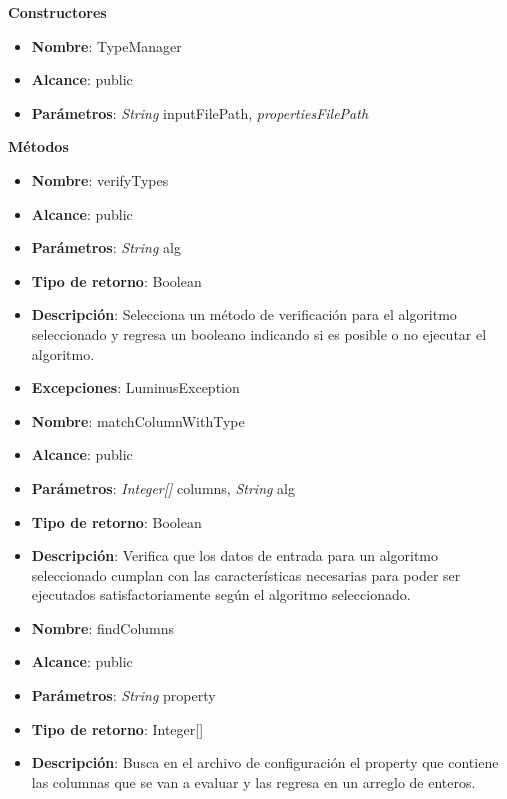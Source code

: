 \textbf{Constructores}
\begin{UClist}
	\begin{itemize}
		\item \textbf{Nombre}: TypeManager
		\item \textbf{Alcance}: public
		\item \textbf{Parámetros}: \emph{String} inputFilePath, \emph{propertiesFilePath}
	\end{itemize}
\end{UClist}
\textbf{Métodos}
\begin{UClist}
	\begin{itemize}
		\item \textbf{Nombre}: verifyTypes
		\item \textbf{Alcance}: public
		\item \textbf{Parámetros}: \emph{String} alg
		\item \textbf{Tipo de retorno}: Boolean
		\item \textbf{Descripción}: Selecciona un método de verificación para el algoritmo seleccionado y regresa un booleano indicando si es posible o no ejecutar el algoritmo.
		\item \textbf{Excepciones}: LuminusException\\
	\end{itemize}
	\begin{itemize}
		\item \textbf{Nombre}: matchColumnWithType
		\item \textbf{Alcance}: public
		\item \textbf{Parámetros}: \emph{Integer[]} columns, \emph{String} alg
		\item \textbf{Tipo de retorno}: Boolean
		\item \textbf{Descripción}: Verifica que los datos de entrada para un algoritmo seleccionado cumplan con las características necesarias para poder ser ejecutados satisfactoriamente según el algoritmo seleccionado.
	\end{itemize}
	\begin{itemize}
		\item \textbf{Nombre}: findColumns
		\item \textbf{Alcance}: public
		\item \textbf{Parámetros}: \emph{String} property
		\item \textbf{Tipo de retorno}: Integer[]
		\item \textbf{Descripción}: Busca en el archivo de configuración el property que contiene las columnas que se van a evaluar y las regresa en un arreglo de enteros.
	\end{itemize}
\end{UClist}
